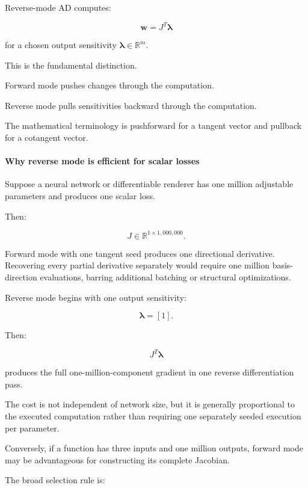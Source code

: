 Reverse-mode AD computes:

\[
\boxed{\mathbf w=J^T\boldsymbol\lambda}
\]

for a chosen output sensitivity \(\boldsymbol\lambda\in\mathbb R^m\).

This is the fundamental distinction.

Forward mode pushes changes through the computation.

Reverse mode pulls sensitivities backward through the computation.

The mathematical terminology is pushforward for a tangent vector and pullback for a cotangent vector.

\paragraph{Why reverse mode is efficient for scalar losses}\label{02-foundations-ii-ch022-why-reverse-mode-is-efficient-for-scalar-losses}

Suppose a neural network or differentiable renderer has one million adjustable parameters and produces one scalar loss.

Then:

\[
J\in\mathbb R^{1\times1{,}000{,}000}.
\]

Forward mode with one tangent seed produces one directional derivative. Recovering every partial derivative separately would require one million basis-direction evaluations, barring additional batching or structural optimizations.

Reverse mode begins with one output sensitivity:

\[
\boldsymbol\lambda=[1].
\]

Then:

\[
J^T\boldsymbol\lambda
\]

produces the full one-million-component gradient in one reverse differentiation pass.

The cost is not independent of network size, but it is generally proportional to the executed computation rather than requiring one separately seeded execution per parameter.

Conversely, if a function has three inputs and one million outputs, forward mode may be advantageous for constructing its complete Jacobian.

The broad selection rule is:

